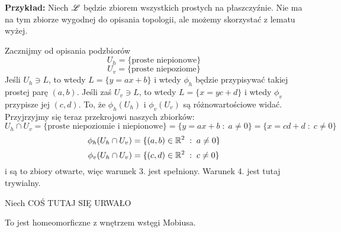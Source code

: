 \textbf{Przykład:} Niech $\mathcal{L}$ będzie zbiorem wszystkich prostych na płaszczyźnie. Nie ma na tym zbiorze wygodnej do opisania topologii, ale możemy skorzystać z lematu wyżej.

Zacznijmy od opisania podzbiorów 
$$U_h=\{\text{proste niepionowe}\}$$
$$U_v=\{\text{proste niepoziome}\}$$
Jeśli $U_h\ni L$, to wtedy $L=\{y=ax+b\}$ i wtedy $\phi_h$ będzie przypisywać takiej prostej parę $(a, b)$. Jeśli zaś $U_v\ni L$, to wtedy $L=\{x=yc+d\}$ i wtedy $\phi_v$ przypisze jej $(c, d)$. To, że $\phi_h(U_h)$ i $\phi_v(U_v)$ są różnowartościowe widać. Przyjrzyjmy się teraz przekrojowi naszych zbiorków:
$$U_h\cap U_v=\{\text{proste niepoziomie i niepionowe}\}=\{y=ax+b\;:\;a\neq 0\}=\{x=cd+d\;:\;c\neq0\}$$
$$\phi_h(U_h\cap U_v)=\{(a,b)\in\mathbb{R}^2\;:\;a\neq 0\}$$
$$\phi_v(U_h\cap U_v)=\{(c,d)\in\mathbb{R}^2\;:\;c\neq0\}$$
i są to zbiory otwarte, więc warunek 3. jest spełniony. Warunek 4. jest tutaj trywialny.

Niech {\large\color{red}COŚ TUTAJ SIĘ URWAŁO}

To jest homeomorficzne z wnętrzem wstęgi Mobiusa.